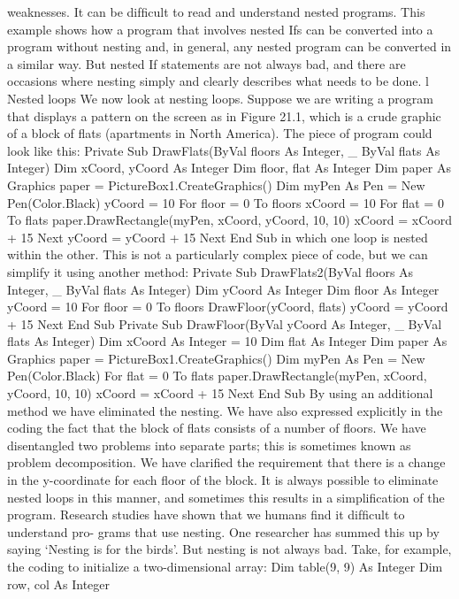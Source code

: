 weaknesses.
It can be difﬁcult to read and understand nested programs. This example shows how a program that involves nested Ifs can be converted into a program without nesting and, in general, any nested program can be converted in a similar way. But nested If statements are not always bad, and there are occasions where nesting simply and clearly describes what needs to be done.
l Nested loops
We now look at nesting loops. Suppose we are writing a program that displays a pattern on the screen as in Figure 21.1, which is a crude graphic of a block of ﬂats (apartments in North America).
The piece of program could look like this:
Private Sub DrawFlats(ByVal floors As Integer, _
				ByVal flats As Integer)
	Dim xCoord, yCoord As Integer
	Dim floor, flat As Integer
	Dim paper As Graphics
	paper = PictureBox1.CreateGraphics()
	Dim myPen As Pen = New Pen(Color.Black)
	yCoord = 10
	For floor = 0 To floors
		xCoord = 10
		For flat = 0 To flats
			paper.DrawRectangle(myPen, xCoord, yCoord, 10, 10)
			xCoord = xCoord + 15
		Next
	yCoord = yCoord + 15
	Next
End Sub
in which one loop is nested within the other. This is not a particularly complex piece of code, but we can simplify it using another method:
Private Sub DrawFlats2(ByVal floors As Integer, _
			ByVal flats As Integer)	
	Dim yCoord As Integer
	Dim floor As Integer
	yCoord = 10
	For floor = 0 To floors
		DrawFloor(yCoord, flats)
		yCoord = yCoord + 15
	Next
End Sub
Private Sub DrawFloor(ByVal yCoord As Integer, _
			ByVal flats As Integer)
	Dim xCoord As Integer = 10
	Dim flat As Integer
	Dim paper As Graphics
	paper = PictureBox1.CreateGraphics()
	Dim myPen As Pen = New Pen(Color.Black)
	For flat = 0 To flats
		paper.DrawRectangle(myPen, xCoord, yCoord, 10, 10)
		xCoord = xCoord + 15
	Next
End Sub
By using an additional method we have eliminated the nesting. We have also expressed explicitly in the coding the fact that the block of ﬂats consists of a number of ﬂoors. 
We have disentangled two problems into separate parts; this is sometimes known as problem decomposition. We have clariﬁed the requirement that there is a change in the y-coordinate for each ﬂoor of the block. It is always possible to eliminate nested loops in this manner, and sometimes this results in a simpliﬁcation of the program.
Research studies have shown that we humans ﬁnd it difﬁcult to understand pro-
grams that use nesting. One researcher has summed this up by saying ‘Nesting is for 
the birds’. But nesting is not always bad. Take, for example, the coding to initialize a two-dimensional array:
Dim table(9, 9) As Integer
Dim row, col As Integer
